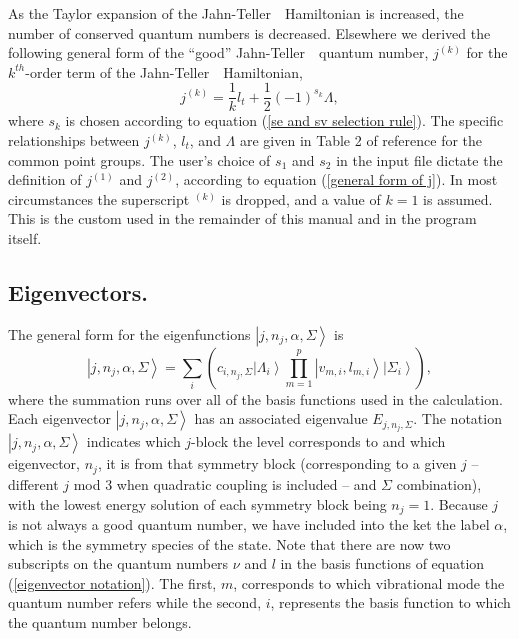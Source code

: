 \documentclass{article}
\newcommand{\JT}{Jahn-Teller\ }
\begin{document}
As the Taylor expansion of the \JT\ Hamiltonian is increased, the
number of conserved quantum numbers is decreased. Elsewhere\cite{tab4}
we derived the following general form of the ``good'' \JT\ quantum
number, $j^{(k)}$ for the $k^{th}$-order term of the \JT\ Hamiltonian,
\begin{equation}
j^{(k)}=\frac{1}{k}l_t+ \frac12 (-1)^{s_k }\Lambda ,
\label{general form of j}
\end{equation}
where $s_k$ is chosen according to equation (\ref{se and sv selection
  rule}). The specific relationships between $j^{(k)}$, $l_t$, and
$\Lambda $ are given in Table 2 of reference  for the
common point groups. The user's choice of $s_1$ and $s_2$ in the input
file dictate the definition of $j^{(1)}$ and $j^{(2)}$, according to
equation (\ref{general form of j}). 
In most circumstances the superscript $^{(k)}$ is
dropped, and a value of $k=1$ is assumed. This is the custom used in
the remainder of this manual and in the program itself.

\subsection{Eigenvectors.} The general form for the eigenfunctions 
$\left| j,n_{j},\alpha ,\Sigma \right\rangle $ is 
\begin{equation}
\left| j,n_{j},\alpha ,\Sigma \right\rangle =\sum_{i}\left( c_{i,n_{j},\Sigma }\left|
\Lambda _{i}\right\rangle 
\prod\limits_{m=1}^{p}\left| v_{m,i},l_{m,i}\right\rangle \left| \Sigma _i \right\rangle 
\right), \label{eigenvector notation}
\end{equation}
where the summation runs over all of the basis functions used in the
calculation. Each eigenvector $\left| j,n_{j},\alpha ,\Sigma \right\rangle $
has an associated eigenvalue $E_{j,n_{j},\Sigma }$. The notation $\left|
j,n_{j},\alpha ,\Sigma \right\rangle $ indicates which $j$-block the level
corresponds to and which eigenvector, $n_{j}$, it is from that symmetry
block (corresponding to a given $j$ -- different $j$ mod 3 when
quadratic coupling is included -- and $\Sigma$ combination), with the
lowest energy solution of each symmetry block being $n_{j}=1$.  
Because $j$
is not always a good quantum number, we have included into the ket the label 
$\alpha $, which is the symmetry species 
of the state. Note that there are now two subscripts on the quantum numbers $\nu $ and $l$
in the basis functions of equation (\ref{eigenvector notation}). 
The first, $m$, corresponds to which vibrational
mode the quantum number refers while the second, $i$, represents the basis
function to which the quantum number belongs. 
\end{document}
